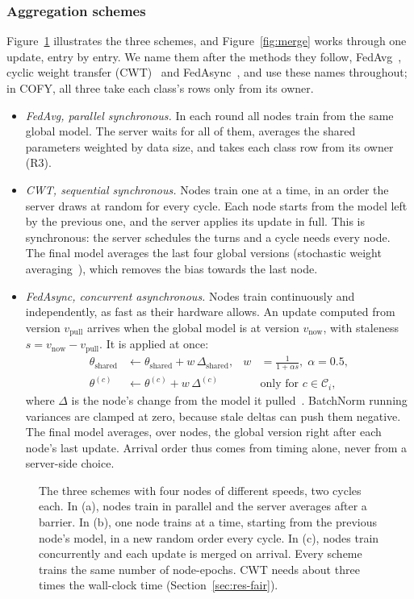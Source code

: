 \documentclass[pdflatex,sn-mathphys-num]{sn-jnl}
\newcommand{\sys}{COFY}
\begin{document}
\subsubsection{Aggregation schemes}
Figure~\ref{fig:schemes} illustrates the three schemes, and Figure~\ref{fig:merge} works through one update, entry by entry. We name them after the methods they follow, FedAvg~\cite{mcmahan2017fedavg}, cyclic weight transfer (CWT)~\cite{chang2018distributed} and FedAsync~\cite{xie2019fedasync}, and use these names throughout; in \sys{}, all three take each class's rows only from its owner.
\begin{itemize}
\item \emph{FedAvg, parallel synchronous.} In each round all nodes train from the same global model. The server waits for all of them, averages the shared parameters weighted by data size, and takes each class row from its owner (R3).
\item \emph{CWT, sequential synchronous.} Nodes train one at a time, in an order the server draws at random for every cycle. Each node starts from the model left by the previous one, and the server applies its update in full. This is synchronous: the server schedules the turns and a cycle needs every node. The final model averages the last four global versions (stochastic weight averaging~\cite{izmailov2018swa}), which removes the bias towards the last node.
\item \emph{FedAsync, concurrent asynchronous.} Nodes train continuously and independently, as fast as their hardware allows. An update computed from version $v_{\text{pull}}$ arrives when the global model is at version $v_{\text{now}}$, with staleness $s=v_{\text{now}}-v_{\text{pull}}$. It is applied at once:
\begin{align}
\theta_{\text{shared}} &\leftarrow \theta_{\text{shared}} + w\,\Delta_{\text{shared}}, & w &= \frac{1}{1+\alpha s},\;\alpha=0.5,\\
\theta^{(c)} &\leftarrow \theta^{(c)} + w\,\Delta^{(c)} &&\text{only for } c\in\mathcal{C}_i,
\end{align}
where $\Delta$ is the node's change from the model it pulled~\cite{xie2019fedasync}. BatchNorm running variances are clamped at zero, because stale deltas can push them negative. The final model averages, over nodes, the global version right after each node's last update. Arrival order thus comes from timing alone, never from a server-side choice.
\end{itemize}

\begin{figure}[t]
\centering

\caption{The three schemes with four nodes of different speeds, two cycles each. In (a), nodes train in parallel and the server averages after a barrier. In (b), one node trains at a time, starting from the previous node's model, in a new random order every cycle. In (c), nodes train concurrently and each update is merged on arrival. Every scheme trains the same number of node-epochs. CWT needs about three times the wall-clock time (Section~\ref{sec:res-fair}).}\label{fig:schemes}
\end{figure}
\end{document}
